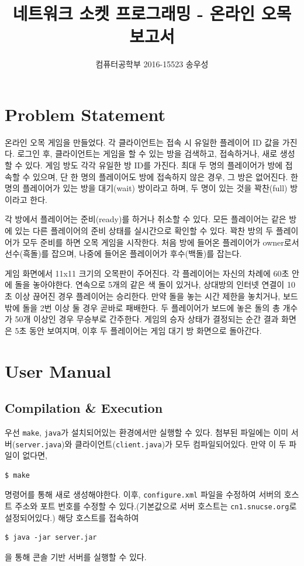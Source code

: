 \documentclass[a4paper, 10pt]{article}
\title{네트워크 소켓 프로그래밍 - 온라인 오목 보고서}
\author{컴퓨터공학부 2016-15523 송우성}
\begin{document}
\maketitle

\section{Problem Statement}
온라인 오목 게임을 만들었다. 각 클라이언트는 접속 시 유일한 플레이어 ID 값을
가진다. 로그인 후, 클라이언트는 게임을 할 수 있는 방을 검색하고, 접속하거나, 새로
생성할 수 있다. 게임 방도 각각 유일한 방 ID를 가진다. 최대 두 명의 플레이어가 방에 접속할
수 있으며, 단 한 명의 플레이어도 방에 접속하지 않은 경우, 그 방은 없어진다. 한
명의 플레이어가 있는 방을 대기(wait) 방이라고 하며, 두 명이 있는 것을 꽉찬(full)
방이라고 한다.

각 방에서 플레이어는 준비(ready)를 하거나 취소할 수 있다. 모든 플레이어는 같은
방에 있는 다른 플레이어의 준비 상태를 실시간으로 확인할 수 있다. 꽉찬 방의 두
플레이어가 모두 준비를 하면 오목 게임을 시작한다. 처음 방에 들어온 플레이어가 owner로서
선수(흑돌)를 잡으며, 나중에 들어온 플레이어가 후수(백돌)를 잡는다.

게임 화면에서 11x11 크기의 오목판이 주어진다. 각 플레이어는 자신의 차례에
60초 안에 돌을 놓아야한다. 연속으로 5개의 같은 색 돌이 있거나, 상대방의
인터넷 연결이 10초 이상 끊어진 경우 플레이어는 승리한다. 만약 돌을 놓는 시간
제한을 놓치거나, 보드 밖에 돌을 2번 이상 둘 경우 곧바로 패배한다. 두 플레이어가
보드에 놓은 돌의 총 개수가 50개 이상인 경우 무승부로 간주한다. 게임의 승자
상태가 결정되는 순간 결과 화면은 5초 동안 보여지며, 이후 두 플레이어는
게임 대기 방 화면으로 돌아간다.

\section{User Manual}
\subsection{Compilation \& Execution}
우선 \texttt{make}, \texttt{java}가 설치되어있는 환경에서만 실행할 수 있다.
첨부된 파일에는 이미 서버(\texttt{server.java})와 클라이언트(\texttt{client.java})가
모두 컴파일되어있다. 만약 이 두 파일이 없다면,
\begin{Verbatim}[tabsize=4,xleftmargin=2em]
$ make
\end{Verbatim}
명령어를 통해 새로 생성해야한다. 이후, \texttt{configure.xml} 파일을 수정하여
서버의 호스트 주소와 포트 번호를 수정할 수 있다.(기본값으로 서버 호스트는
\texttt{cn1.snucse.org}로 설정되어있다.) 해당 호스트를 접속하여
\begin{Verbatim}[tabsize=4,xleftmargin=2em]
$ java -jar server.jar
\end{Verbatim}
을 통해 콘솔 기반 서버를 실행할 수 있다.
\end{document}
